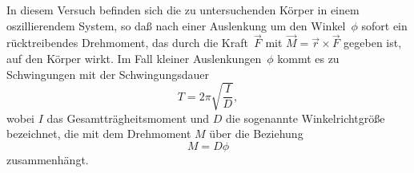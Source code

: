 In diesem Versuch befinden sich die zu untersuchenden Körper in einem
oszillierendem System, so daß nach einer Auslenkung um den Winkel~$\phi$
sofort ein rücktreibendes Drehmoment, das durch die Kraft~$\vec{F}$ mit
$\vec{M} = \vec{r} \times \vec{F}$ gegeben ist, auf den Körper wirkt.
Im Fall kleiner Auslenkungen~$\phi$ kommt es zu Schwingungen mit der
Schwingungsdauer
\begin{equation}
  \label{eq:periode}
  T = 2 \pi \sqrt{\frac{I}{D}},
\end{equation}
wobei $I$ das Gesamtträgheitsmoment und $D$ die sogenannte
Winkelrichtgröße bezeichnet, die mit dem Drehmoment $M$ über die
Beziehung
\begin{equation}
  \label{eq:drehmoment-winkelricht}
  M = D \phi
\end{equation}
zusammenhängt.

